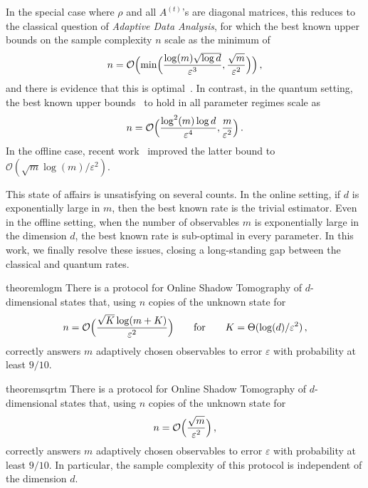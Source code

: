\documentclass[10pt]{article}
\renewcommand{\epsilon}{\varepsilon}
\begin{document}
\noindent In the special case where $\rho$ and all $A^{(t)}$'s are diagonal matrices, this reduces to the classical question of \emph{Adaptive Data Analysis}, for which the best known upper bounds on the sample complexity $n$ scale as the minimum of
\begin{equation}
    n = \mathcal{O}\Bigl(\min\Bigl(\frac{\log(m)\sqrt{\log d}}{\epsilon^3}, \frac{\sqrt{m}}{\epsilon^2}\Bigr)\Bigr)\,, \label{eq:rate}
\end{equation}
and there is evidence that this is optimal~\cite{NSSSU18,lyu2025fingerprinting}.
In contrast, in the quantum setting, the best known upper bounds~\cite{BO24,BB24} to hold in all parameter regimes scale as
\begin{equation}
    n = \mathcal{O}\Bigl(\frac{\log^2(m)\log d}{\epsilon^4}, \frac{m}{\epsilon^2}\Bigr)\,.\label{eq:old_rate}
\end{equation}
In the offline case, recent work~\cite{Sin25} improved the latter bound to $\mathcal{O}(\sqrt{m} \log(m)/\epsilon^2)$.

This state of affairs is unsatisfying on several counts. In the online setting, if $d$ is exponentially large in $m$, then the best known rate is the trivial estimator. Even in the offline setting, when the number of observables $m$ is exponentially large in the dimension $d$, the best known rate is sub-optimal in every parameter. In this work, we finally resolve these issues, closing a long-standing gap between the classical and quantum rates.

\begin{restatable}{theorem}{logm}\label{thm:main_logm}
    There is a protocol for Online Shadow Tomography of $d$-dimensional states that, using $n$ copies of the unknown state for
    \begin{equation}
        n = \mathcal{O}\Bigl(\frac{\sqrt{K}\log(m+K)}{\epsilon^2}\Bigr) \qquad \mathrm{for} \qquad K = \Theta(\log(d)/\epsilon^2)\,,
    \end{equation}
    correctly answers $m$ adaptively chosen observables to error $\epsilon$ with probability at least $9/10$.
\end{restatable}

\begin{restatable}{theorem}{sqrtm}\label{thm:main_sqrtm}
    There is a protocol for Online Shadow Tomography of $d$-dimensional states that, using $n$ copies of the unknown state for
    \begin{equation}
        n = \mathcal{O}\Bigl(\frac{\sqrt{m}}{\epsilon^2}\Bigr)\,,
    \end{equation}
    correctly answers $m$ adaptively chosen observables to error $\epsilon$ with probability at least $9/10$. In particular, the sample complexity of this protocol is independent of the dimension $d$.
\end{restatable}
\end{document}
